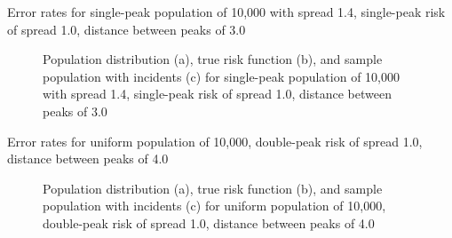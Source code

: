 \begin{table}[H]
    
    \caption[]{Error rates for single-peak population of 10,000 with \gls{spread} 1.4, single-peak risk of \gls{spread} 1.0, distance between peaks of 3.0}
    \label{tab:mean_error_rates:p1.4_100_1_1h_3s}
\end{table}

\begin{figure}[H]
    
    \caption[]{Population distribution (a), true risk function (b), and sample population with incidents (c) for single-peak population of 10,000 with \gls{spread} 1.4, single-peak risk of \gls{spread} 1.0, distance between peaks of 3.0}
    \label{fig:distributions:p1.4_100_1_1h_3s}    
\end{figure}

\graphicspath{{./results/p1.4_100_1_1h_4s/}}
\makeatletter
{}
\makeatother

\begin{table}[H]
    
    \caption[]{Error rates for uniform population of 10,000, double-peak risk of spread 1.0, distance between peaks of 4.0}
    \label{tab:mean_error_rates:p1.4_100_1_1h_4s}
\end{table}

\begin{figure}[H]
    
    \caption[]{Population distribution (a), true risk function (b), and sample population with incidents (c) for uniform population of 10,000, double-peak risk of \gls{spread} 1.0, distance between peaks of 4.0}
    \label{fig:distributions:p1.4_100_1_1h_4s}    
\end{figure}

